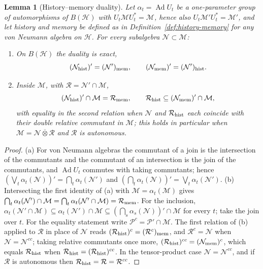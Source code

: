 \documentclass[a4paper,11pt]{article}
\newtheorem{lemma}[theorem]{Lemma}
\theoremstyle{definition}
\begin{document}
\begin{lemma}[History--memory duality]\label{lem:history-memory}
Let $\alpha_t=\operatorname{Ad}U_t$ be a one-parameter group of automorphisms of $B(\mathcal H)$ with $U_t\mathcal MU_t^*=\mathcal M$, hence also $U_t\mathcal M'U_t^*=\mathcal M'$, and let history and memory be defined as in Definition~\ref{def:history-memory} for any von Neumann algebra on $\mathcal H$. For every subalgebra $\mathcal N\subset\mathcal M$:
\begin{enumerate}
 \item[\rm(a)] On $B(\mathcal H)$ the duality is exact,
 \begin{equation}
  (\mathcal N_{\rm hist})'=(\mathcal N')_{\rm mem},\qquad (\mathcal N_{\rm mem})'=(\mathcal N')_{\rm hist}.
  \label{eq:history-memory-BH}
 \end{equation}
 \item[\rm(b)] Inside $\mathcal M$, with $\mathcal R=\mathcal N'\cap\mathcal M$,
 \begin{equation}
  (\mathcal N_{\rm hist})'\cap\mathcal M=\mathcal R_{\rm mem},\qquad
  \mathcal R_{\rm hist}\subseteq(\mathcal N_{\rm mem})'\cap\mathcal M ,
  \label{eq:history-memory}
 \end{equation}
 with equality in the second relation when $\mathcal N$ and $\mathcal R_{\rm hist}$ each coincide with their double relative commutant in $\mathcal M$; this holds in particular when $\mathcal M=\mathcal N\overline\otimes\mathcal R$ and $\mathcal R$ is autonomous.
\end{enumerate}
\end{lemma}
\begin{proof}
(a) For von Neumann algebras the commutant of a join is the intersection of the commutants and the commutant of an intersection is the join of the commutants, and $\operatorname{Ad}U_t$ commutes with taking commutants; hence $(\bigvee_t\alpha_t(\mathcal N))'=\bigcap_t\alpha_t(\mathcal N')$ and $(\bigcap_t\alpha_t(\mathcal N))'=\bigvee_t\alpha_t(\mathcal N')$.
(b) Intersecting the first identity of (a) with $\mathcal M=\alpha_t(\mathcal M)$ gives $\bigcap_t\alpha_t(\mathcal N')\cap\mathcal M=\bigcap_t\alpha_t(\mathcal N'\cap\mathcal M)=\mathcal R_{\rm mem}$. For the inclusion, $\alpha_t(\mathcal N'\cap\mathcal M)\subseteq\alpha_t(\mathcal N')\cap\mathcal M\subseteq(\bigcap_s\alpha_s(\mathcal N))'\cap\mathcal M$ for every $t$; take the join over $t$. For the equality statement write $\mathcal P^c=\mathcal P'\cap\mathcal M$. The first relation of (b) applied to $\mathcal R$ in place of $\mathcal N$ reads $(\mathcal R_{\rm hist})^c=(\mathcal R^c)_{\rm mem}$, and $\mathcal R^c=\mathcal N$ when $\mathcal N=\mathcal N^{cc}$; taking relative commutants once more, $(\mathcal R_{\rm hist})^{cc}=(\mathcal N_{\rm mem})^c$, which equals $\mathcal R_{\rm hist}$ when $\mathcal R_{\rm hist}=(\mathcal R_{\rm hist})^{cc}$. In the tensor-product case $\mathcal N=\mathcal N^{cc}$, and if $\mathcal R$ is autonomous then $\mathcal R_{\rm hist}=\mathcal R=\mathcal R^{cc}$.
\end{proof}
\end{document}
